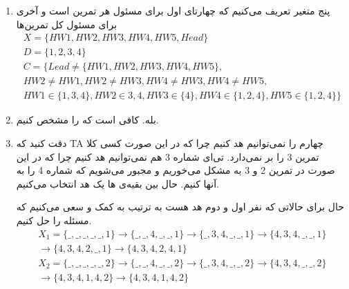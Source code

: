 \begin{enumerate}
    \item پنج متغیر تعریف می‌کنیم که چهارتای اول برای مسئول هر تمرین است و آخری برای مسئول کل تمرین‌ها
    \begin{gather*}
        X = \{HW1, HW2, HW3, HW4, HW5, Head\}\\
        D = \{1, 2, 3, 4\}\\
        C = \{Lead \neq \{HW1, HW2, HW3, HW4, HW5\},\\
        HW2 \ne HW1, HW2 \ne HW3, HW4 \ne HW3, HW4 \ne HW5,\\
        HW1 \in \{1, 3, 4\}, HW2 \in {3, 4}, HW3 \in \{4\}, HW4 \in \{1, 2, 4\}, HW5 \in \{1, 2, 4\}
        \}
    \end{gather*}
    \begin{center}
    \end{center}
    \item بله. کافی است که  را مشخص کنیم.
    \item دقت کنید که TA چهارم را نمی‌توانیم هد کنیم چرا که در این صورت کسی کلا تمرین 3 را بر نمی‌دارد.
    تی‌ای شماره 3 هم نمی‌توانیم هد کنیم چرا که در این صورت در تمرین 2 و 3 به مشکل می‌خوریم و مجبور می‌شویم که شماره 4
    را به آنها  کنیم.
    حال بین بقیه‌ی ها یک هد انتخاب می‌کنیم.

    حال برای حالاتی که نفر اول و دوم هد هست به ترتیب به کمک  و  سعی می‌کنیم که مسئله را حل کنیم.
    \begin{gather*}
        X_1 = \{\_,\_,\_,\_,\_,1\} \rightarrow \{\_,\_,4,\_,\_,1\} \rightarrow \{\_,3,4,\_,\_,1\} \rightarrow \{4,3,4,\_,\_,1\} \\
        \rightarrow \{4,3,4,2,\_,1\} \rightarrow \{4,3,4,2,4,1\}\\
        X_2 = \{\_,\_,\_,\_,\_,2\} \rightarrow \{\_,\_,4,\_,\_,2\} \rightarrow \{\_,3,4,\_,\_,2\} \rightarrow \{4,3,4,\_,\_,2\} \\
        \rightarrow \{4,3,4,1,4,2\} \rightarrow \{4,3,4,1,4,2\}
    \end{gather*}
\end{enumerate}








